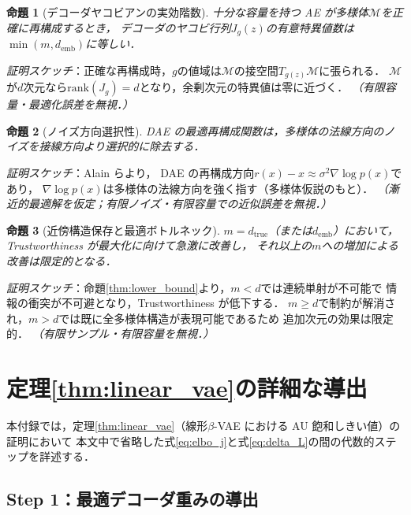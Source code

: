 \documentclass[11pt,a4paper]{jsarticle}
\newtheorem{proposition}{命題}
\newcommand{\dtrue}{d_{\mathrm{true}}}
\newcommand{\Jg}{J_g}
\newcommand{\demb}{d_{\mathrm{emb}}}
\begin{document}
\begin{proposition}[デコーダヤコビアンの実効階数]\label{thm:rank}
十分な容量を持つ AE が多様体$\mathcal{M}$を正確に再構成するとき，
デコーダのヤコビ行列$\Jg(z)$の有意特異値数は$\min(m, \demb)$に等しい．
\end{proposition}
\textit{証明スケッチ}：正確な再構成時，$g$の値域は$\mathcal{M}$の接空間$T_{g(z)}\mathcal{M}$に張られる．
$\mathcal{M}$が$d$次元なら$\mathrm{rank}(\Jg) = d$となり，余剰次元の特異値は零に近づく．
\textit{（有限容量・最適化誤差を無視．）}

\begin{proposition}[ノイズ方向選択性]\label{thm:nsr}
DAE の最適再構成関数は，多様体の法線方向のノイズを接線方向より選択的に除去する．
\end{proposition}
\textit{証明スケッチ}：Alain ら\cite{alain2014dae}より，
DAE の再構成方向$r(x) - x \approx \sigma^2 \nabla\log p(x)$であり，
$\nabla\log p(x)$は多様体の法線方向を強く指す（多様体仮説のもと）．
\textit{（漸近的最適解を仮定；有限ノイズ・有限容量での近似誤差を無視．）}

\begin{proposition}[近傍構造保存と最適ボトルネック]\label{thm:trust}
$m = \dtrue$（または$\demb$）において，Trustworthiness が最大化に向けて急激に改善し，
それ以上の$m$への増加による改善は限定的となる．
\end{proposition}
\textit{証明スケッチ}：命題\ref{thm:lower_bound}より，$m < d$では連続単射が不可能で
情報の衝突が不可避となり，Trustworthiness が低下する．
$m \geq d$で制約が解消され，$m > d$では既に全多様体構造が表現可能であるため
追加次元の効果は限定的．
\textit{（有限サンプル・有限容量を無視．）}

\section{定理\ref{thm:linear_vae}の詳細な導出}\label{app:linear_vae_proof}

本付録では，定理\ref{thm:linear_vae}（線形$\beta$-VAE における AU 飽和しきい値）の証明において
本文中で省略した式\eqref{eq:elbo_j}と式\eqref{eq:delta_L}の間の代数的ステップを詳述する．

\subsection*{Step 1：最適デコーダ重みの導出}
\end{document}
